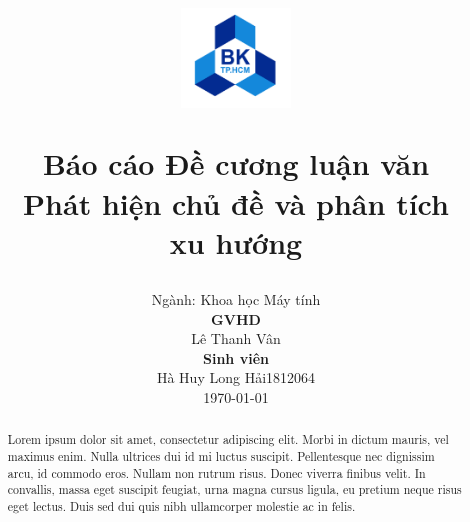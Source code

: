 \documentclass[11pt, a4paper]{article}
\begin{document}
	\title{
	\begin{figure}[!ht]
		\centering
			\includegraphics[width=0.26\textwidth]{img/logo/LogoBKChinhThuc.png}
	\end{figure}
    \vspace{0.1cm}
	\Large {Báo cáo Đề cương luận văn} \\
	\vspace{0.3cm}
	\Huge {Phát hiện chủ đề và phân tích\\xu hướng} \\
    \vspace{0.3cm}
    }
    \author{}
	
	
	
	\date{
	{\Large Ngành: Khoa học Máy tính\\}
	\vspace{1.8cm}
	\textbf{\large GVHD\\} \smallskip
	Lê Thanh Vân\\
	\vspace{0.4cm}
	\textbf{\large Sinh viên\\} \smallskip
	Hà Huy Long Hải\hspace{0.5cm}1812064\\
	\vspace{5cm}
	\normalsize{\today}
    }
    
    \vspace{1cm}

	\maketitle
	\thispagestyle{empty}
	\setlength{\parindent}{0pt}

\vspace{2cm}

\begin{abstract}
	Lorem ipsum dolor sit amet, consectetur adipiscing elit. Morbi in dictum mauris, vel maximus enim. Nulla ultrices dui id mi luctus suscipit. Pellentesque nec dignissim arcu, id commodo eros. Nullam non rutrum risus. Donec viverra finibus velit. In convallis, massa eget suscipit feugiat, urna magna cursus ligula, eu pretium neque risus eget lectus. Duis sed dui quis nibh ullamcorper molestie ac in felis.
\end{abstract}
\end{document}
